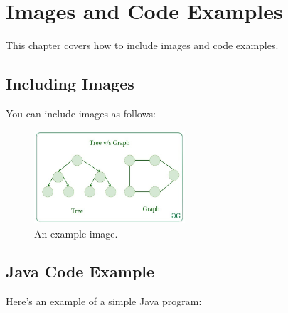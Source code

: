 \chapter{Images and Code Examples}
This chapter covers how to include images and code examples.

\section{Including Images}
You can include images as follows:

\begin{figure}[h]
  \centering
  \includegraphics[width=0.5\textwidth]{images/tree_vs_graph.jpg}
  \caption{An example image.}
  \label{fig:example-image}
\end{figure}

\section{Java Code Example}
Here’s an example of a simple Java program:

